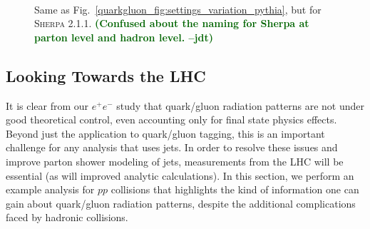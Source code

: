 \documentclass[11pt]{cernrep}
\newcommand{\jdt}[1]{\textbf{\textcolor{darkgreen}{(#1 --jdt)}}}
\begin{document}
\begin{figure}
\centering
{}
$\qquad$
\caption{Same as Fig.~\ref{quarkgluon_fig:settings_variation_pythia}, but for \textsc{Sherpa 2.1.1}. \jdt{Confused about the naming for Sherpa at parton level and hadron level.}}
\label{quarkgluon_fig:settings_variation_sherpa}
\end{figure}

\subsection{Looking Towards the LHC}
\label{quarkgluon_sec:pp}

It is clear from our $e^+e^-$ study that quark/gluon radiation patterns are not under good theoretical control, even accounting only for final state physics effects.  Beyond just the application to quark/gluon tagging, this is an important challenge for any analysis that uses jets.  In order to resolve these issues and improve parton shower modeling of jets, measurements from the LHC will be essential (as will improved analytic calculations).  In this section, we perform an example analysis for $pp$ collisions that highlights the kind of information one can gain about quark/gluon radiation patterns, despite the additional complications faced by hadronic collisions.
\end{document}
